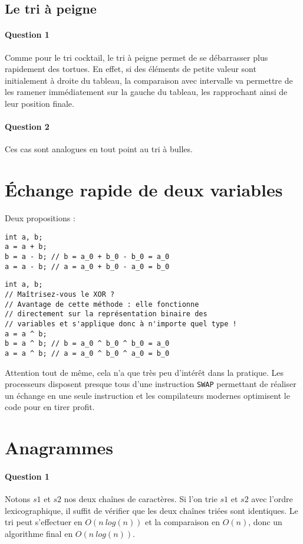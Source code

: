 \documentclass{article}%
\begin{document}
\subsection{Le tri à peigne}

\paragraph{Question 1} Comme pour le tri cocktail, le tri à peigne permet de se débarrasser plus rapidement des tortues. En effet, si des éléments de petite valeur sont initialement à droite du tableau, la comparaison avec intervalle va permettre de les ramener immédiatement sur la gauche du tableau, les rapprochant ainsi de leur position finale.

\paragraph{Question 2} Ces cas sont analogues en tout point au tri à bulles.

\section{Échange rapide de deux variables}

Deux propositions :
\begin{verbatim}
int a, b;
a = a + b;
b = a - b; // b = a_0 + b_0 - b_0 = a_0
a = a - b; // a = a_0 + b_0 - a_0 = b_0
\end{verbatim}

\begin{verbatim}
int a, b;
// Maîtrisez-vous le XOR ?
// Avantage de cette méthode : elle fonctionne
// directement sur la représentation binaire des
// variables et s'applique donc à n'importe quel type !
a = a ^ b;
b = a ^ b; // b = a_0 ^ b_0 ^ b_0 = a_0
a = a ^ b; // a = a_0 ^ b_0 ^ a_0 = b_0
\end{verbatim}

Attention tout de même, cela n'a que très peu d'intérêt dans la pratique. Les processeurs disposent presque tous d'une instruction \texttt{SWAP} permettant de réaliser un échange en une seule instruction et les compilateurs modernes optimisent le code pour en tirer profit.

\section{Anagrammes}

\paragraph{Question 1} Notons $s1$ et $s2$ nos deux chaînes de caractères. Si l'on trie $s1$ et $s2$ avec l'ordre lexicographique, il suffit de vérifier que les deux chaînes triées sont identiques. Le tri peut s'effectuer en $O(n~log(n))$ et la comparaison en $O(n)$, donc un algorithme final en $O(n~log (n))$.
\end{document}
